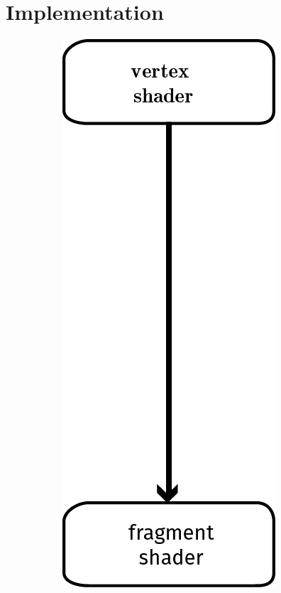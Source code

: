 
\section{Implementation}
\label{s:implementation}

	\begin{figure}
		\centering
		\begin{subfigure}[b]{0.4\columnwidth}
			\centering
			\includegraphics[width=\textwidth]{content/img/implementation/pipeline_oldOpenGL.png}

\end{subfigure}
\end{figure}
